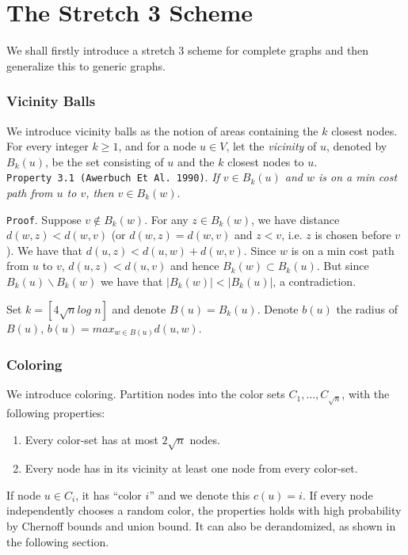 \chapter{The Stretch 3 Scheme}
We shall firstly introduce a stretch 3 scheme for complete graphs and then
generalize this to generic graphs.

\subsection{Vicinity Balls}
We introduce vicinity balls as the notion of areas containing the $k$ closest
nodes. For every integer $k \geq 1$, and for a node $u \in V$, let the
\textit{vicinity} of $u$, denoted by $B_k(u)$, be the set consisting of $u$
and the $k$ closest nodes to $u$.\\

\texttt{Property 3.1 (Awerbuch Et Al. 1990)}. \textit{If $v\in B_k(u)$ and $w$
is on a min cost path from $u$ to $v$, then $v\in B_k(w)$}.

\texttt{Proof}. Suppose $v\not\in B_k(w)$. For any $z\in B_k(w)$, we have
distance $d(w,z) < d(w,v)$ (or $d(w,z) = d(w,v)$ and $z < v$, i.e. $z$ is
chosen before $v$). We have that $d(u,z) < d(u,w) + d(w,v)$. Since $w$ is
on a min cost path from $u$ to $v$, $d(u,z) < d(u,v)$ and hence $B_k(w)
\subset B_k(u)$. But since $B_k(u) \backslash B_k(w)$ we have that $|B_k(w)| <
|B_k(u)|$, a contradiction.

Set $k=[4 \sqrt{n}log\; n]$ and denote $B(u) = B_k(u)$. Denote $b(u)$ the
radius of $B(u)$, $b(u)=max_{w\in B(u)} d(u,w)$.

\subsection{Coloring}
We introduce coloring.
Partition nodes into the color sets $C_1,\dots,C_{\sqrt{n}}$, with the
following properties:
\begin{enumerate}
    \item Every color-set has at most $2 \sqrt{n}$ nodes.
    \item Every node has in its vicinity at least one node from every
color-set.
\end{enumerate}

If node $u\in C_i$, it has ``color $i$'' and we denote this $c(u)=i$. If every
node independently chooses a random color, the properties holds with high
probability by Chernoff bounds and union bound. It can also be derandomized,
as shown in the following section.

